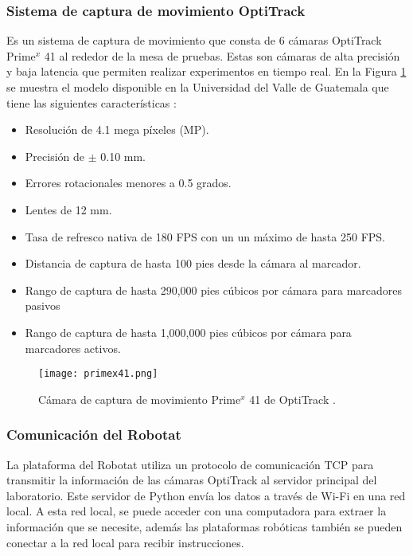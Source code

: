 \subsubsection*{Sistema de captura de movimiento OptiTrack}
Es un sistema de captura de movimiento que consta de 6 cámaras OptiTrack Prime$^x$ 41 al rededor de la mesa de pruebas. Estas son cámaras de alta precisión y baja latencia que permiten realizar experimentos en tiempo real. En la Figura \ref{fig:OptiTrack_primex41} se muestra el modelo disponible en la Universidad del Valle de Guatemala que tiene las siguientes características \cite{primex41}:

\begin{itemize}
	\item Resolución de 4.1 mega píxeles (MP).
	\item Precisión de $\pm$ 0.10 mm.
	\item Errores rotacionales menores a 0.5 grados.
	\item Lentes de 12 mm.
	\item Tasa de refresco nativa de 180 FPS con un un máximo de hasta 250 FPS.
	\item Distancia de captura de hasta 100 pies desde la cámara al marcador.
	\item Rango de captura de hasta 290,000 pies cúbicos por cámara para marcadores pasivos
	\item Rango de captura de hasta 1,000,000 pies cúbicos por cámara para marcadores activos.
\end{itemize}

\begin{figure}[H]
	\centering
	\texttt{[image: primex41.png]}
	\caption{Cámara de captura de movimiento Prime$^x$ 41 de OptiTrack \cite{primex41}.}
	\label{fig:OptiTrack_primex41}
\end{figure}

\subsubsection*{Comunicación del Robotat}
La plataforma del Robotat utiliza un protocolo de comunicación TCP para transmitir la información de las cámaras OptiTrack al servidor principal del laboratorio. Este servidor de Python envía los datos a través de Wi-Fi en una red local. A esta red local, se puede acceder con una computadora para extraer la información que se necesite, además las plataformas robóticas también se pueden conectar a la red local para recibir instrucciones.

